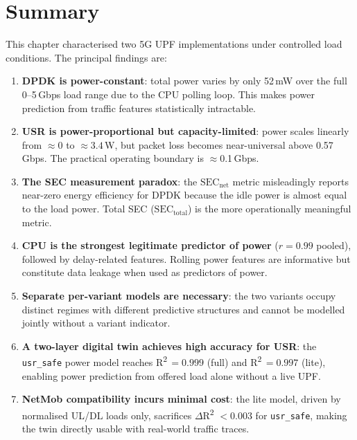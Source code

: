 \documentclass[12pt, a4paper]{report}
\newcommand{\sectable}{$\mathrm{SEC}_{\mathrm{total}}$}
\newcommand{\secnet}{$\mathrm{SEC}_{\mathrm{net}}$}
\begin{document}
\section{Summary}
\label{sec:summary}

This chapter characterised two 5G UPF implementations under controlled
load conditions.
The principal findings are:

\begin{enumerate}
  \item \textbf{DPDK is power-constant}: total power varies by only
    52\,mW over the full 0--5\,Gbps load range due to the
    CPU polling loop. This makes power prediction from traffic features
    statistically intractable.
  \item \textbf{USR is power-proportional but capacity-limited}: power
    scales linearly from $\approx 0$ to $\approx 3.4$\,W, but packet loss
    becomes near-universal above 0.57\,Gbps. The
    practical operating boundary is $\approx$0.1\,Gbps.
  \item \textbf{The SEC measurement paradox}: the \secnet{} metric
    misleadingly reports near-zero energy efficiency for DPDK because the
    idle power is almost equal to the load power. Total SEC (\sectable{})
    is the more operationally meaningful metric.
  \item \textbf{CPU is the strongest legitimate predictor of power}
    ($r = 0.99$ pooled), followed by delay-related features.
    Rolling power features are informative but constitute data leakage
    when used as predictors of power.
  \item \textbf{Separate per-variant models are necessary}: the two variants
    occupy distinct regimes with different predictive structures and cannot
    be modelled jointly without a variant indicator.
  \item \textbf{A two-layer digital twin achieves high accuracy for USR}:
    the \texttt{usr\_safe} power model reaches R\textsuperscript{2}\,$= 0.999$
    (full) and R\textsuperscript{2}\,$= 0.997$ (lite), enabling power
    prediction from offered load alone without a live UPF.
  \item \textbf{NetMob compatibility incurs minimal cost}: the lite model,
    driven by normalised UL/DL loads only, sacrifices $\Delta$R\textsuperscript{2}
    $< 0.003$ for \texttt{usr\_safe}, making the twin directly usable with
    real-world traffic traces.
\end{enumerate}


\end{document}
